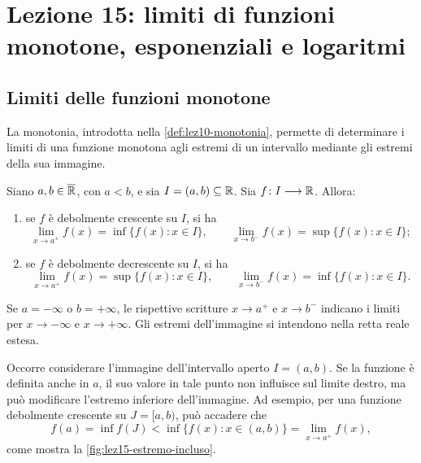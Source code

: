 \chapter[Lezione 15 --- 28 ottobre 2026]{Lezione 15: limiti di funzioni monotone, esponenziali e logaritmi}
\label{chap:lezione-15}

\section{Limiti delle funzioni monotone}
\label{sec:lez15-limiti-monotone}

La monotonia, introdotta nella \cref{def:lez10-monotonia},
permette di determinare i limiti di una funzione monotona
agli estremi di un intervallo mediante gli estremi della sua immagine.

\begin{theorem}
\label{thm:lez15-limiti-monotone}
Siano \(a,b\in\overline{\mathbb{R}}\), con \(a<b\), e sia
\(I=(a,b)\subseteq\mathbb{R}\). Sia \(f\colon I\longrightarrow\mathbb{R}\). Allora:
\begin{enumerate}
  \item se \(f\) è debolmente crescente su \(I\), si ha
  \[
    \lim_{x\to a^+}f(x)=\inf\{f(x):x\in I\},
    \qquad
    \lim_{x\to b^-}f(x)=\sup\{f(x):x\in I\};
  \]
  \item se \(f\) è debolmente decrescente su \(I\), si ha
  \[
    \lim_{x\to a^+}f(x)=\sup\{f(x):x\in I\},
    \qquad
    \lim_{x\to b^-}f(x)=\inf\{f(x):x\in I\}.
  \]
\end{enumerate}
Se \(a=-\infty\) o \(b=+\infty\), le rispettive scritture
\(x\to a^+\) e \(x\to b^-\) indicano i limiti per
\(x\to-\infty\) e \(x\to+\infty\).
Gli estremi dell'immagine si intendono nella retta reale estesa.
\end{theorem}

Occorre considerare l'immagine dell'intervallo aperto
\(I=(a,b)\). Se la funzione è definita anche in \(a\),
il suo valore in tale punto non influisce sul limite destro,
ma può modificare l'estremo inferiore dell'immagine.
Ad esempio, per una funzione debolmente crescente su
\(J=[a,b)\), può accadere che
\[
  f(a)=\inf f(J)
  <\inf\{f(x):x\in(a,b)\}
  =\lim_{x\to a^+}f(x),
\]
come mostra la \cref{fig:lez15-estremo-incluso}.

